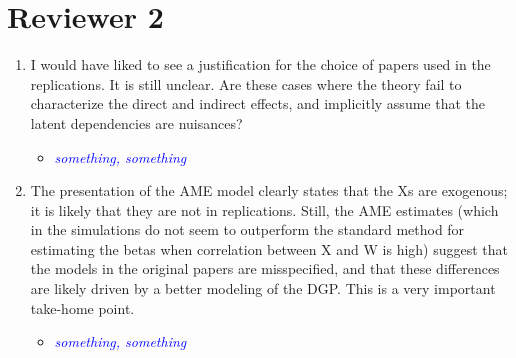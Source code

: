 \section*{Reviewer 2}

\begin{enumerate}
	\item I would have liked to see a justification for the choice of papers used in the replications. It is still unclear. Are these cases where the theory fail to characterize the direct and indirect effects, and implicitly assume that the latent dependencies are nuisances?
	\begin{itemize}
		\item \textcolor{blue}{ \emph{
		something, something
		}}
	\end{itemize}
	\item The presentation of the AME model clearly states that the Xs are exogenous; it is likely that they are not in replications. Still, the AME estimates (which in the simulations do not seem to outperform the standard method for estimating the betas when correlation between X and W is high) suggest that the models in the original papers are misspecified, and that these differences are likely driven by a better modeling of the DGP. This is a very important take-home point.
	\begin{itemize}
		\item \textcolor{blue}{ \emph{
			something, something
			}}
	\end{itemize}
\end{enumerate}
